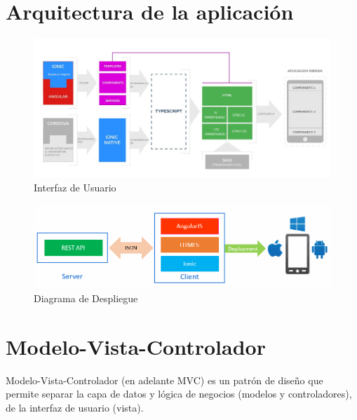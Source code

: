 \section{Arquitectura de la aplicación}

\begin{figure}[H]
  \centering
    \includegraphics[width=1\textwidth]{imagenes/implementacion/interfazDeUsuario.jpg}
    
     \caption{Interfaz de Usuario}
    \label{fig:arquitectura-aplicacion}
\end{figure}

    \begin{figure}[H]
        \centering
        \includegraphics[width=1\textwidth]{imagenes/implementacion/despliegue.png}
        \caption{Diagrama de Despliegue}
        \label{diagrama-despliegue}
    \end{figure}


\section{Modelo-Vista-Controlador}

Modelo-Vista-Controlador (en adelante MVC) es un patrón de diseño que permite
separar la capa de datos y lógica de negocios (modelos y controladores), de la interfaz
de usuario (vista).

